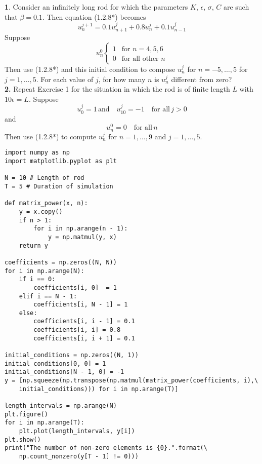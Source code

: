 \documentclass{amsbook}%
\theoremstyle{plain}
\numberwithin{equation}{section}
\begin{document}
	\noindent\textbf{1}. Consider an infinitely long rod for which the parameters $K$, $\epsilon$, $\sigma$, $C$ are such that $\beta = 0.1$. Then equation (1.2.8*) becomes
	\begin{equation}
		u^{j+1}_n=0.1u^j_{n+1}+0.8u^j_n+0.1u^j_{n-1}
	\end{equation}
	Suppose
	\begin{equation}
		u^0_n
		\begin{cases}
			1 & \text{for $n=4,5,6$}\\
			0 & \text{for all other $n$}
		\end{cases}
	\end{equation}
	Then use (1.2.8*) and this initial condition to compose $u^j_n$ for $n=-5,\dots,5$ for $j=1,\dots,5$. For each value of $j$, for how many $n$ is $u^j_n$ different from zero?
	\\[12pt]

	\noindent\textbf{2.} Repeat Exercise 1 for the situation in which the rod is of finite length $L$ with $10\epsilon=L$. Suppose
	\begin{equation}
		u^j_0=1\,\text{and}\quad u^j_{10}=-1\quad\text{for all}\,j>0
	\end{equation}
	and
	\begin{equation}
		u^0_n=0\quad\text{for all}\,n
	\end{equation}
	Then use (1.2.8*) to compute $u^j_n$ for $n=1,\ldots,9$ and $j=1,\ldots,5$.
	\\[12pt]
\begin{small}
\begin{verbatim}
import numpy as np
import matplotlib.pyplot as plt

N = 10 # Length of rod
T = 5 # Duration of simulation

def matrix_power(x, n):
    y = x.copy()
    if n > 1:
        for i in np.arange(n - 1):
            y = np.matmul(y, x)
    return y

coefficients = np.zeros((N, N))
for i in np.arange(N):
    if i == 0:
        coefficients[i, 0]  = 1
    elif i == N - 1:
        coefficients[i, N - 1] = 1
    else:
        coefficients[i, i - 1] = 0.1
        coefficients[i, i] = 0.8
        coefficients[i, i + 1] = 0.1

initial_conditions = np.zeros((N, 1))
initial_conditions[0, 0] = 1
initial_conditions[N - 1, 0] = -1
y = [np.squeeze(np.transpose(np.matmul(matrix_power(coefficients, i),\
	initial_conditions))) for i in np.arange(T)]

length_intervals = np.arange(N)
plt.figure()
for i in np.arange(T):
    plt.plot(length_intervals, y[i])
plt.show()
print("The number of non-zero elements is {0}.".format(\
	np.count_nonzero(y[T - 1] != 0)))
\end{verbatim}
\end{small}
\end{document}
